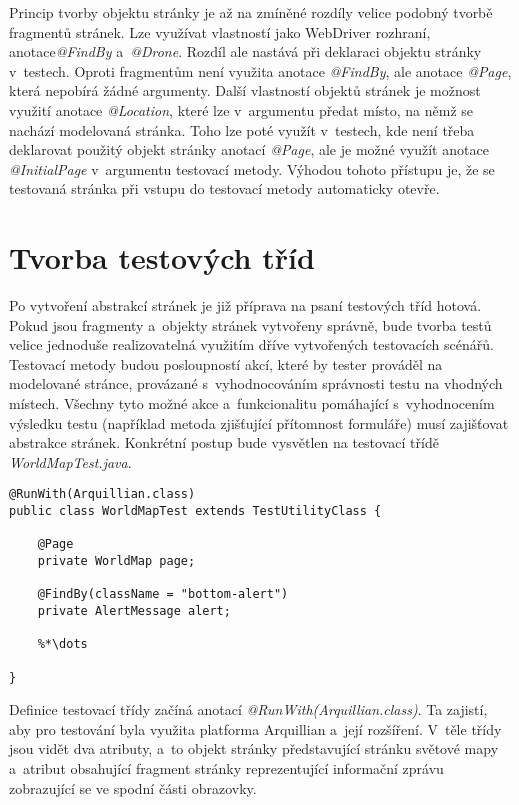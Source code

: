 \documentclass[
    color,   %
	table,   %
    twoside, %
    nolot, nolof,
]{fithesis3}
\begin{document}
Princip tvorby objektu stránky je až na zmíněné rozdíly velice podobný tvorbě fragmentů stránek. Lze využívat vlastností jako WebDriver rozhraní, anotace\emph{@FindBy} a~\emph{@Drone}. Rozdíl ale nastává při deklaraci objektu stránky v~testech. Oproti fragmentům není využita anotace \emph{@FindBy}, ale anotace \emph{@Page}, která nepobírá žádné argumenty. Další vlastností objektů stránek je možnost využití anotace \emph{@Location}, které lze v~argumentu předat místo, na němž se nachází modelovaná stránka. Toho lze poté využít v~testech, kde není třeba deklarovat použitý objekt stránky anotací \emph{@Page}, ale je možné využít anotace \emph{@InitialPage} v~argumentu testovací metody. Výhodou tohoto přístupu je, že se testovaná stránka při vstupu do testovací metody automaticky otevře.

\section{Tvorba testových tříd}
Po vytvoření abstrakcí stránek je již příprava na psaní testových tříd hotová. Pokud jsou fragmenty a~objekty stránek vytvořeny správně, bude tvorba testů velice jednoduše realizovatelná využitím dříve vytvořených testovacích scénářů. Testovací metody budou posloupností akcí, které by tester prováděl na modelované stránce, provázané s~vyhodnocováním správnosti testu na vhodných místech. Všechny tyto možné akce a~funkcionalitu pomáhající s~vyhodnocením výsledku testu (například metoda zjišťující přítomnost formuláře) musí zajišťovat abstrakce stránek. Konkrétní postup bude vysvětlen na testovací třídě \emph{WorldMapTest.java}.

\begin{lstlisting}
@RunWith(Arquillian.class)
public class WorldMapTest extends TestUtilityClass {

	@Page
	private WorldMap page;
 	
 	@FindBy(className = "bottom-alert")
	private AlertMessage alert;
	
 	%*\dots
 	
}
\end{lstlisting} 

Definice testovací třídy začíná anotací \emph{@RunWith(Arquillian.class)}. Ta zajistí, aby pro testování byla využita platforma Arquillian a~její rozšíření. V~těle třídy jsou vidět dva atributy, a~to objekt stránky představující stránku světové mapy a~atribut obsahující fragment stránky reprezentující informační zprávu zobrazující se ve spodní části obrazovky.
\end{document}
